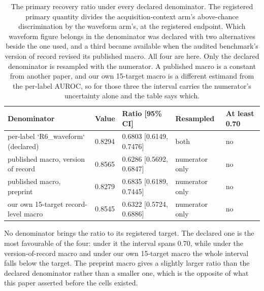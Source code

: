 \begin{table}[t]
\centering
\small
\caption{The primary recovery ratio under every declared denominator. The registered primary quantity divides the acquisition-context arm's above-chance discrimination by the waveform arm's, at the registered endpoint. Which waveform figure belongs in the denominator was declared with two alternatives beside the one used, and a third became available when the audited benchmark's version of record revised its published macro. All four are here. Only the declared denominator is resampled with the numerator. A published macro is a constant from another paper, and our own 15-target macro is a different estimand from the per-label AUROC, so for those three the interval carries the numerator's uncertainty alone and the table says which.}
\label{tab:recovery_denominators}
\begin{tabular}{lllll}
\toprule
Denominator & Value & Ratio [95\% CI] & Resampled & At least 0.70 \\
\midrule
per-label `R6\_waveform` (declared) & 0.8294 & 0.6803 [0.6149, 0.7476] & both & no \\
published macro, version of record & 0.8565 & 0.6286 [0.5692, 0.6847] & numerator only & no \\
published macro, preprint & 0.8279 & 0.6835 [0.6189, 0.7445] & numerator only & no \\
our own 15-target record-level macro & 0.8545 & 0.6322 [0.5724, 0.6886] & numerator only & no \\
\bottomrule
\end{tabular}
\par\footnotesize No denominator brings the ratio to its registered target. The declared one is the most favourable of the four: under it the interval spans 0.70, while under the version-of-record macro and under our own 15-target macro the whole interval falls below the target. The preprint macro gives a slightly larger ratio than the declared denominator rather than a smaller one, which is the opposite of what this paper asserted before the cells existed.
\end{table}

